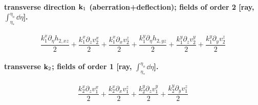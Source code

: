 \paragraph{transverse direction $\mathbf k_1$ (aberration+deflection); fields of order 2 [ray, $\int_{\eta_*}^{\eta_o}\dd\eta$].}
\begin{dmath*}\frac{{k^{x}_{1}} \partial_\eta  h_{2,xz}}{2} + \frac{{k^{x}_{1}} \partial_z  {v^{x}_{2}}}{2} + \frac{{k^{x}_{1}} \partial_x  {v^{z}_{2}}}{2} + \frac{{k^{y}_{1}} \partial_\eta  h_{2,yz}}{2} + \frac{{k^{y}_{1}} \partial_z  {v^{y}_{2}}}{2} + \frac{{k^{y}_{1}} \partial_y  {v^{z}_{2}}}{2}\end{dmath*}
\paragraph{transverse $\mathbf k_2$; fields of order 1 [ray, $\int_{\eta_*}^{\eta_o}\dd\eta$].}
\begin{dmath*}\frac{{k^{x}_{2}} \partial_z  {v^{x}_{1}}}{2} + \frac{{k^{x}_{2}} \partial_x  {v^{z}_{1}}}{2} + \frac{{k^{y}_{2}} \partial_z  {v^{y}_{1}}}{2} + \frac{{k^{y}_{2}} \partial_y  {v^{z}_{1}}}{2}\end{dmath*}
